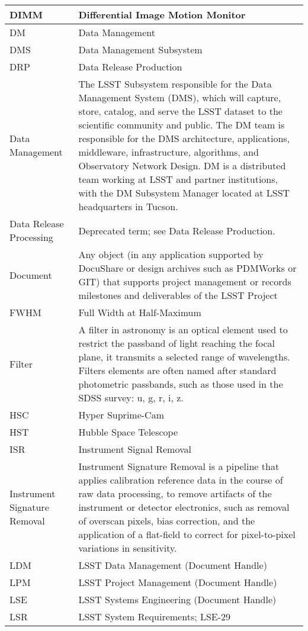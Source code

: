 \begin{longtable}{|l|p{}|}
DIMM & Differential Image Motion Monitor \\\hline
DM & Data Management \\\hline
DMS & Data Management Subsystem \\\hline
DRP & Data Release Production \\\hline
Data Management & The LSST Subsystem responsible for the Data Management System (DMS), which will capture, store, catalog, and serve the LSST dataset to the scientific community and public. The DM team is responsible for the DMS architecture, applications, middleware, infrastructure, algorithms, and Observatory Network Design. DM is a distributed team working at LSST and partner institutions, with the DM Subsystem Manager located at LSST headquarters in Tucson. \\\hline
Data Release Processing & Deprecated term; see Data Release Production. \\\hline
Document & Any object (in any application supported by DocuShare or design archives such as PDMWorks or GIT) that supports project management or records milestones and deliverables of the LSST Project \\\hline
FWHM & Full Width at Half-Maximum \\\hline
Filter & A filter in astronomy is an optical element used to restrict the passband of light reaching the focal plane, it transmits a selected range of wavelengths. Filters elements are often named after standard photometric passbands, such as those used in the SDSS survey: u, g, r, i, z. \\\hline
HSC & Hyper Suprime-Cam \\\hline
HST & Hubble Space Telescope \\\hline
ISR & Instrument Signal Removal \\\hline
Instrument Signature Removal & Instrument Signature Removal is a pipeline that applies calibration reference data in the course of raw data processing, to remove artifacts of the instrument or detector electronics, such as removal of overscan pixels, bias correction, and the application of a flat-field to correct for pixel-to-pixel variations in sensitivity. \\\hline
LDM & LSST Data Management (Document Handle) \\\hline
LPM & LSST Project Management (Document Handle) \\\hline
LSE & LSST Systems Engineering (Document Handle) \\\hline
LSR & LSST System Requirements; LSE-29 \\\hline

\end{longtable}
